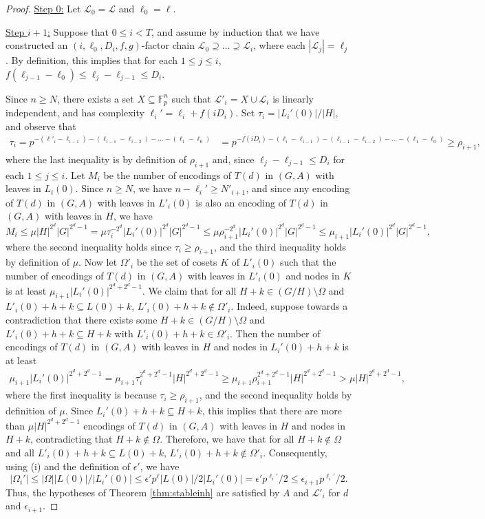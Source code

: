 \documentclass[12pt,oneside,british,a4wide]{amsart}
\numberwithin{equation}{section}
\theoremstyle{definition}
\def\F{\mathbb{F}}
\def\e{\epsilon}
\newcommand{\calL}{\mathcal{L}}
\begin{document}
\begin{proof}
\noindent \underline{Step 0:} Let $\calL_0=\calL$ and $\ell_0=\ell$.

\noindent\underline{Step $i+1$:} Suppose that $0\leq i<T$, and assume by induction that we have constructed an $(  i, \ell_{0},D_i,f,g)$-factor chain $\calL_0\supseteq \ldots \supseteq \calL_i$, where each $|\calL_j|=\ell_j$.   By definition, this implies that for each $1\leq j\leq i$, $f(\ell_{j-1}-\ell_0)\leq \ell_j-\ell_{j-1}\leq D_i$.  

Since $n\geq N$, there exists a set $X\subseteq \F_p^n$ such that $\calL'_i=X\cup \calL_i$ is linearly independent, and has complexity $\ell_i'=  \ell_i+ f(iD_i)$.  Set $\tau_i=|L_i'(0)|/|H|$, and observe that 
\begin{align*}
\tau_i=p^{-(\ell'_i-\ell_{i-1})-(\ell_{i-1}-\ell_{i-2})-\ldots-(\ell_1-\ell_0)}&=p^{-f(iD_i)-(\ell_i-\ell_{i-1})-(\ell_{i-1}-\ell_{i-2})-\ldots-(\ell_1-\ell_0)}\geq \rho_{i+1},
\end{align*}
where the last inequality is by definition of $\rho_{i+1}$ and, since $\ell_j-\ell_{j-1}\leq D_i$ for each $1\leq j\leq i$.  Let $M_i$ be the number of encodings of $T(d)$ in $(G,A)$ with leaves in $L_i(0)$.  Since $n\geq N$, we have $n-\ell_i'\geq N'_{i+1}$, and since any encoding of $T(d)$ in $(G,A)$ with leaves in $L'_i(0)$ is also an encoding of $T(d)$ in $(G,A)$ with leaves in $H$, we have
$$
M_i\leq \mu |H|^{2^d}|G|^{2^d-1}=\mu \tau_i^{-2^d}|L_i'(0)|^{2^d}|G|^{2^d-1}\leq \mu \rho_{i+1}^{-2^d}|L_i'(0)|^{2^d}|G|^{2^d-1}\leq \mu_{i+1} |L_i'(0)|^{2^d}|G|^{2^d-1},
$$
where the second inequality holds since $\tau_i\geq \rho_{i+1}$, and the third inequality holds by definition of $\mu$.  Now let $\Omega'_i$ be the set of cosets $K$ of $L'_i(0)$ such that the number of encodings of $T(d)$ in $(G,A)$ with leaves in $L'_i(0)$ and nodes in $K$ is at least $\mu_{i+1} |L_i'(0)|^{2^d+2^d-1}$.  We claim that for all $H+k\in (G/H)\setminus \Omega$ and $L'_i(0)+h+k\subseteq L(0)+k$, $L'_i(0)+h+k\notin \Omega'_i$.  Indeed, suppose towards a contradiction that there exists some $H+k\in (G/H)\setminus \Omega$ and  $L'_i(0)+h+k\subseteq H+k$ with $L'_i(0)+h+k\in \Omega'_i$.  Then the number of encodings of $T(d)$ in $(G,A)$ with leaves in $H$ and nodes in $L_i'(0)+h+k$ is at least
\begin{align*}
\mu_{i+1} |L_i'(0)|^{2^d+2^d-1}=\mu_{i+1} \tau_i^{2^d+2^d-1}|H|^{2^d+2^d-1}\geq \mu_{i+1}\rho_{i+1}^{2^d+2^d-1}|H|^{2^d+2^d-1}>\mu |H|^{2^d+2^d-1},
\end{align*}
where the first inequality is because $\tau_i\geq \rho_{i+1}$, and the second inequality holds by definition of $\mu$. Since $L_i'(0)+h+k\subseteq H+k$, this implies that there are more than $\mu|H|^{2^d+2^d-1}$ encodings of $T(d)$ in $(G,A)$ with leaves in $H$ and nodes in $H+k$, contradicting that $H+k\notin \Omega$.  Therefore, we have that for all $H+k\notin \Omega$ and all $L'_i(0)+h+k\subseteq L(0)+k$, $L'_i(0)+h+k\notin \Omega'_i$.  Consequently, using (i) and the definition of $\e'$, we have
$$
|\Omega_i'|\leq |\Omega||L(0)|/|L_i'(0)|\leq \e' p^{\ell} |L(0)|/2|L_i'(0)|=\e' p^{\ell_i'}/2\leq \e_{i+1}p^{\ell_i'}/2.
$$
Thus, the hypotheses of Theorem \ref{thm:stableinh} are satisfied by $A$ and $\calL'_i$ for $d$ and $\e_{i+1}$.


\end{proof}
\end{document}
